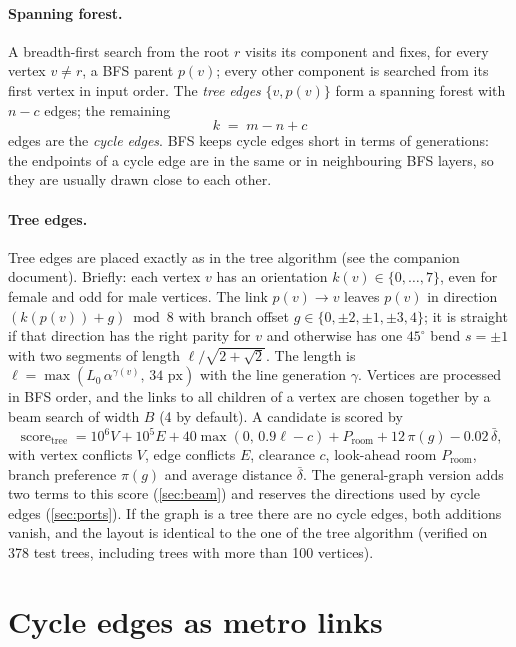 \documentclass[11pt,a4paper]{article}
\newcommand{\len}{\ell}
\newcommand{\Score}{\operatorname{score}}
\begin{document}
\paragraph{Spanning forest.} A breadth-first search from the root $r$ visits its component and fixes, for every vertex $v\neq r$, a BFS parent $p(v)$; every other component is searched from its first vertex in input order. The \emph{tree edges} $\{v,p(v)\}$ form a spanning forest with $n-c$ edges; the remaining
\[
  k \;=\; m-n+c
\]
edges are the \emph{cycle edges}. BFS keeps cycle edges short in terms of generations: the endpoints of a cycle edge are in the same or in neighbouring BFS layers, so they are usually drawn close to each other.

\paragraph{Tree edges.} Tree edges are placed exactly as in the tree algorithm (see the companion document). Briefly: each vertex $v$ has an orientation $k(v)\in\{0,\dots,7\}$, even for female and odd for male vertices. The link $p(v)\to v$ leaves $p(v)$ in direction $(k(p(v))+g)\bmod 8$ with branch offset $g\in\{0,\pm2,\pm1,\pm3,4\}$; it is straight if that direction has the right parity for $v$ and otherwise has one $45^\circ$ bend $s=\pm1$ with two segments of length $\len/\sqrt{2+\sqrt2}$. The length is $\len=\max(L_0\,\alpha^{\gamma(v)},\,34\text{ px})$ with the line generation $\gamma$. Vertices are processed in BFS order, and the links to all children of a vertex are chosen together by a beam search of width $B$ (4 by default). A candidate is scored by
\[
  \Score_{\text{tree}} = 10^6 V + 10^5 E + 40\max(0,\,0.9\len-c) + P_{\text{room}} + 12\,\pi(g) - 0.02\,\bar\delta ,
\]
with vertex conflicts $V$, edge conflicts $E$, clearance $c$, look-ahead room $P_{\text{room}}$, branch preference $\pi(g)$ and average distance $\bar\delta$. The general-graph version adds two terms to this score (\cref{sec:beam}) and reserves the directions used by cycle edges (\cref{sec:ports}). If the graph is a tree there are no cycle edges, both additions vanish, and the layout is identical to the one of the tree algorithm (verified on 378 test trees, including trees with more than 100 vertices).

\section{Cycle edges as metro links}
\label{sec:cycle}
\end{document}
